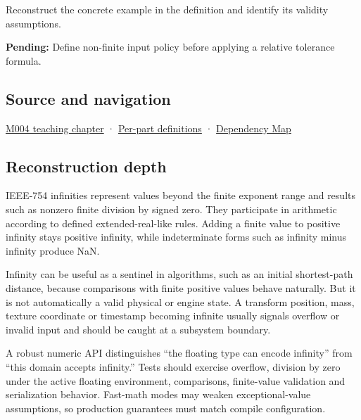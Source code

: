Reconstruct the concrete example in the definition and identify its validity assumptions.

\textbf{Pending:} Define non-finite input policy before applying a relative tolerance formula.

\subsection{Source and navigation}\label{appendix-eb336149c00a-source-and-navigation}

\hyperref[01-foundations-i-ch001-a-stretching-ruler-for-real-valued-quantities]{M004 teaching chapter} · \hyperref[appendix-fd090d982a15-m004---parts-61-76]{Per-part definitions} · \hyperref[appendix-4ad47bdd269a]{Dependency Map}

\subsection{Reconstruction depth}\label{appendix-eb336149c00a-reconstruction-depth}

IEEE-754 infinities represent values beyond the finite exponent range and results such as nonzero finite division by signed zero. They participate in arithmetic according to defined extended-real-like rules. Adding a finite value to positive infinity stays positive infinity, while indeterminate forms such as infinity minus infinity produce NaN.

Infinity can be useful as a sentinel in algorithms, such as an initial shortest-path distance, because comparisons with finite positive values behave naturally. But it is not automatically a valid physical or engine state. A transform position, mass, texture coordinate or timestamp becoming infinite usually signals overflow or invalid input and should be caught at a subsystem boundary.

A robust numeric API distinguishes ``the floating type can encode infinity'' from ``this domain accepts infinity.'' Tests should exercise overflow, division by zero under the active floating environment, comparisons, finite-value validation and serialization behavior. Fast-math modes may weaken exceptional-value assumptions, so production guarantees must match compile configuration.
